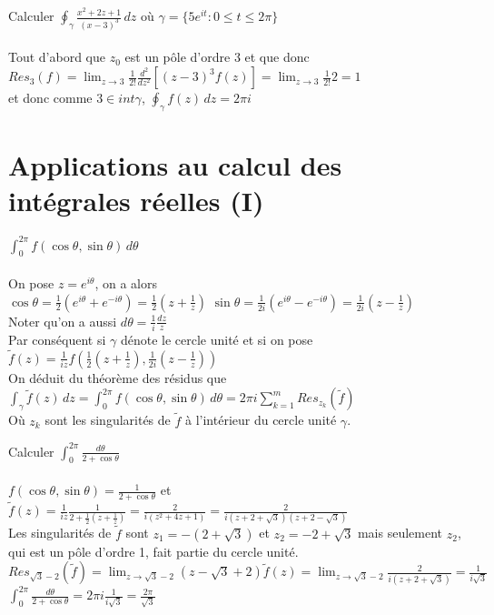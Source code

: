 \begin{myExample}
	Calculer $\oint_\gamma \frac{x^2+2z+1}{(x-3)^3}\,dz$ où $\gamma= \{5e^{it}: 0\leq t\leq 2\pi\}$
	\\\\
	Tout d'abord que $z_0$ est un pôle d'ordre 3 et que donc
	\\
	$Res_3(f)=\lim_{z\rightarrow 3}\frac{1}{2!}\frac{d^2}{dz^2}[(z-3)^3f(z)]=\lim_{z\rightarrow 3} \frac{1}{2!}2=1$
	\\et donc comme $3\in int\gamma$, $\oint_\gamma f(z)\,dz=2\pi i$
\end{myExample}

\section{Applications au calcul des intégrales réelles (I)}

\begin{myProperty}
	$\int_{0}^{2\pi}f(\cos \theta, \sin \theta)\,d\theta$
	\\\\
	On pose $z=e^{i\theta}$, on a alors
	\\
	$\cos \theta = \frac{1}{2}(e^{i\theta}+e^{-i\theta})=\frac{1}{2}(z+\frac{1}{z})$
	$\sin \theta = \frac{1}{2i}(e^{i\theta}-e^{-i\theta})=\frac{1}{2i}(z-\frac{1}{z})$
	\\
	Noter qu'on a aussi $d\theta=\frac{1}{i}\frac{dz}{z}$
	\\
	Par conséquent si $\gamma$ dénote le cercle unité et si on pose
	\\
	$\tilde{f}(z)=\frac{1}{iz}f(\frac{1}{2}(z+\frac{1}{z}),\frac{1}{2i}(z-\frac{1}{z}))$
	\\
	On déduit du théorème des résidus que
	\\
	$\int_\gamma\tilde{f}(z)\,dz=\int_{0}^{2\pi}f(\cos \theta, \sin \theta)\,d\theta=2\pi i\sum_{k=1}^{m} Res_{z_{k}}(\tilde{f})$
	\\
	Où $z_k$ sont les singularités de $\tilde{f}$ à l'intérieur du cercle unité $\gamma$.
\end{myProperty}

\begin{myExample}
	Calculer $\int_{0}^{2\pi} \frac{d\theta}{2+\cos\theta}$
	\\\\
	$f(\cos \theta,\sin \theta)=\frac{1}{2+\cos\theta}$ et
	\\
	$\tilde{f}(z)=\frac{1}{iz}\frac{1}{2+\frac{1}{2}(z+\frac{1}{z})}=\frac{2}{i(z^2+4z+1)}=\frac{2}{i(z+2+\sqrt{3})(z+2-\sqrt{3})}$
	\\Les singularités de $\tilde{f}$ sont $z_1=-(2+\sqrt{3})$ et $z_2=-2+\sqrt{3}$ mais seulement $z_2$, qui est un pôle d'ordre 1, fait partie du cercle unité.
	\\
	$Res_{\sqrt{3}-2}(\tilde{f})=\lim_{z\rightarrow \sqrt{3}-2} (z-\sqrt{3}+2)\tilde{f}(z)=\lim_{z\rightarrow \sqrt{3}-2} \frac{2}{i(z+2+\sqrt{3})}=\frac{1}{i\sqrt{3}}$
	\\
	$\int_{0}^{2\pi} \frac{d\theta}{2+\cos\theta}=2\pi i \frac{1}{i\sqrt{3}}=\frac{2\pi}{\sqrt{3}}$
\end{myExample}

